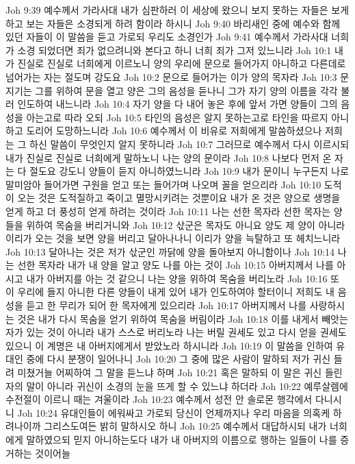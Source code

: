 Joh 9:39  예수께서 가라사대 내가 심판하러 이 세상에 왔으니 보지 못하는 자들은 보게 하고 보는 자들은 소경되게 하려 함이라 하시니
Joh 9:40  바리새인 중에 예수와 함께 있던 자들이 이 말씀을 듣고 가로되 우리도 소경인가
Joh 9:41  예수께서 가라사대 너희가 소경 되었더면 죄가 없으려니와 본다고 하니 너희 죄가 그저 있느니라
Joh 10:1  내가 진실로 진실로 너희에게 이르노니 양의 우리에 문으로 들어가지 아니하고 다른데로 넘어가는 자는 절도며 강도요
Joh 10:2  문으로 들어가는 이가 양의 목자라
Joh 10:3  문지기는 그를 위하여 문을 열고 양은 그의 음성을 듣나니 그가 자기 양의 이름을 각각 불러 인도하여 내느니라
Joh 10:4  자기 양을 다 내어 놓은 후에 앞서 가면 양들이 그의 음성을 아는고로 따라 오되
Joh 10:5  타인의 음성은 알지 못하는고로 타인을 따르지 아니하고 도리어 도망하느니라
Joh 10:6  예수께서 이 비유로 저희에게 말씀하셨으나 저희는 그 하신 말씀이 무엇인지 알지 못하니라
Joh 10:7  그러므로 예수께서 다시 이르시되 내가 진실로 진실로 너희에게 말하노니 나는 양의 문이라
Joh 10:8  나보다 먼저 온 자는 다 절도요 강도니 양들이 듣지 아니하였느니라
Joh 10:9  내가 문이니 누구든지 나로 말미암아 들어가면 구원을 얻고 또는 들어가며 나오며 꼴을 얻으리라
Joh 10:10  도적이 오는 것은 도적질하고 죽이고 멸망시키려는 것뿐이요 내가 온 것은 양으로 생명을 얻게 하고 더 풍성히 얻게 하려는 것이라
Joh 10:11  나는 선한 목자라 선한 목자는 양들을 위하여 목숨을 버리거니와
Joh 10:12  삯군은 목자도 아니요 양도 제 양이 아니라 이리가 오는 것을 보면 양을 버리고 달아나나니 이리가 양을 늑탈하고 또 헤치느니라
Joh 10:13  달아나는 것은 저가 삯군인 까닭에 양을 돌아보지 아니함이나
Joh 10:14  나는 선한 목자라 내가 내 양을 알고 양도 나를 아는 것이
Joh 10:15  아버지께서 나를 아시고 내가 아버지를 아는 것 같으니 나는 양을 위하여 목숨을 버리노라
Joh 10:16  또 이 우리에 들지 아니한 다른 양들이 내게 있어 내가 인도하여야 할터이니 저희도 내 음성을 듣고 한 무리가 되어 한 목자에게 있으리라
Joh 10:17  아버지께서 나를 사랑하시는 것은 내가 다시 목숨을 얻기 위하여 목숨을 버림이라
Joh 10:18  이를 내게서 빼앗는 자가 있는 것이 아니라 내가 스스로 버리노라 나는 버릴 권세도 있고 다시 얻을 권세도 있으니 이 계명은 내 아버지에게서 받았노라 하시니라
Joh 10:19  이 말씀을 인하여 유대인 중에 다시 분쟁이 일어나니
Joh 10:20  그 중에 많은 사람이 말하되 저가 귀신 들려 미쳤거늘 어찌하여 그 말을 듣느냐 하며
Joh 10:21  혹은 말하되 이 말은 귀신 들린 자의 말이 아니라 귀신이 소경의 눈을 뜨게 할 수 있느냐 하더라
Joh 10:22  예루살렘에 수전절이 이르니 때는 겨울이라
Joh 10:23  예수께서 성전 안 솔로몬 행각에서 다니시니
Joh 10:24  유대인들이 에워싸고 가로되 당신이 언제까지나 우리 마음을 의혹케 하려나이까 그리스도여든 밝히 말하시오 하니
Joh 10:25  예수께서 대답하시되 내가 너희에게 말하였으되 믿지 아니하는도다 내가 내 아버지의 이름으로 행하는 일들이 나를 증거하는 것이어늘
